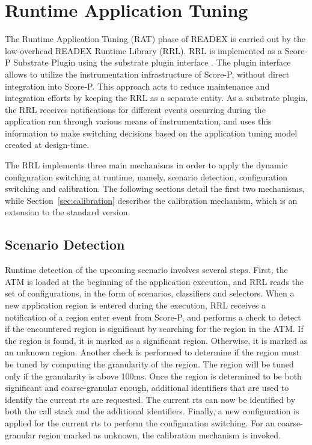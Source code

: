 \section{Runtime Application Tuning} \label{rat}

The Runtime Application Tuning (RAT) phase of READEX is carried out by the low-overhead READEX Runtime Library (RRL). RRL is implemented as a Score-P Substrate Plugin using the substrate plugin interface \cite{Schoene2017}. The plugin interface allows to utilize the instrumentation infrastructure of Score-P, without direct integration into Score-P. This approach acts to reduce maintenance and integration efforts by keeping the RRL as a separate entity. As a substrate plugin, the RRL receives notifications for different events occurring during the application run through various means of instrumentation, and uses this information to make switching decisions based on the application tuning model created at design-time.

The RRL implements three main mechanisms in order to apply the dynamic configuration switching at runtime, namely, scenario detection, configuration switching and calibration. The following sections detail the first two mechanisms, while Section~\ref{sec:calibration} describes the calibration mechanism, which is an extension to the standard version.


\subsection{Scenario Detection}\label{scenario-detection}
Runtime detection of the upcoming scenario involves several steps. First, the ATM is loaded at the beginning of the application execution, and RRL reads the set of configurations, in the form of scenarios, classifiers and selectors. When a new application region is entered during the execution, RRL receives a notification of a region enter event from Score-P, and performs a check to detect if the encountered region is significant by searching for the region in the ATM. If the region is found, it is marked as a significant region. Otherwise, it is marked as an unknown region. Another check is performed to determine if the region must be tuned by computing the granularity of the region. The region will be tuned only if the granularity is above 100ms. Once the region is determined to be both significant and coarse-granular enough, additional identifiers that are used to identify the current rts are requested. The current rts can now be identified by both the call stack and the additional identifiers. Finally, a new configuration is applied for the current rts to perform the configuration switching.
For an coarse-granular region marked as unknown, the calibration mechanism is invoked.

